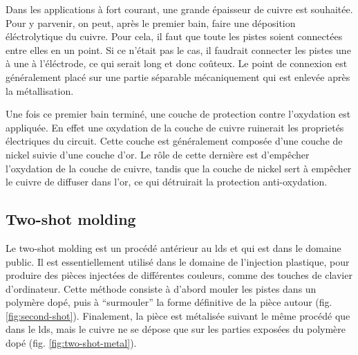 Dans les applications à fort courant, une grande épaisseur de cuivre est souhaitée.
Pour y parvenir, on peut, après le premier bain, faire une déposition éléctrolytique du cuivre.
Pour cela, il faut que toute les pistes soient connectées entre elles en un point.
Si ce n'était pas le cas, il faudrait connecter les pistes une à une à l'éléctrode, ce qui serait long et donc coûteux.
Le point de connexion est généralement placé sur une partie séparable mécaniquement qui est enlevée après la métallisation.

Une fois ce premier bain terminé, une couche de protection contre l'oxydation est appliquée.
En effet une oxydation de la couche de cuivre ruinerait les proprietés électriques du circuit.
Cette couche est généralement composée d'une couche de nickel suivie d'une couche d'or.
Le rôle de cette dernière est d'empêcher l'oxydation de la couche de cuivre, tandis que la couche de nickel sert à empêcher le cuivre de diffuser dans l'or, ce qui détruirait la protection anti-oxydation.

\subsection{Two-shot molding}
Le two-shot molding est un procédé antérieur au \gls{lds} et qui est dans le domaine public.
Il est essentiellement utilisé dans le domaine de l'injection plastique, pour produire des pièces injectées de différentes couleurs, comme des touches de clavier d'ordinateur.
Cette méthode consiste à d'abord mouler les pistes dans un polymère dopé, puis à ``surmouler'' la forme définitive de la pièce autour (fig. \ref{fig:second-shot}).
Finalement, la pièce est métalisée suivant le même procédé que dans le \gls{lds}, mais le cuivre ne se dépose que sur les parties exposées du polymère dopé (fig. \ref{fig:two-shot-metal}).


